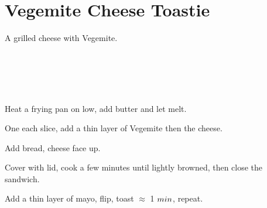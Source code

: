 \section{Vegemite Cheese Toastie}

\begin{recipestats}[
        servings=1,
        preptime=5~\minute,
        bakingtime=15~\minute,
        source=Mike,
        original=\citefield{vegemiteCheeseToastie}{title}~\cite{vegemiteCheeseToastie},
    ]
\end{recipestats}

\begin{recipeabstract}
    A grilled cheese with Vegemite.
\end{recipeabstract}

\begin{ingredientcolumns}
    \begin{ingredientblock}
        \\
    \end{ingredientblock}
    \begin{ingredientblock}
        \\
        \\
    \end{ingredientblock}
\end{ingredientcolumns}

\begin{preparation}
\item Heat a frying pan on low, add butter and let melt.
\item One each slice, add a thin layer of Vegemite then the cheese.
\item Add bread, cheese face up.
\item Cover with lid, cook a few minutes until lightly browned, then close the sandwich.
\item Add a thin layer of mayo, flip, toast $\approx$ 1 $\minute$, repeat.
\end{preparation}

\recipeend%
